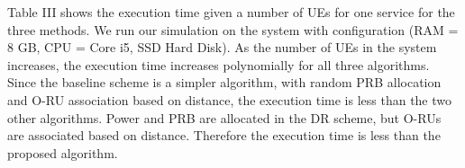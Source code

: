 \documentclass[lettersize,journal]{IEEEtran}
\begin{document}
Table III shows the execution time given a number of UEs for one service for the three methods. We run our simulation on the system with configuration (RAM = 8 GB, CPU = Core i5, SSD Hard Disk). 
 As the number of UEs in the system increases, the execution time increases polynomially for all three algorithms.
Since the baseline scheme is a simpler algorithm, with random PRB allocation and O-RU association based on distance, the execution time is less than the two other algorithms. Power and PRB are allocated in the DR scheme, but O-RUs are associated based on distance. Therefore the execution time is less than the proposed algorithm.
\begin{table}%
 \caption {Execution Time vs. Number of UEs} 
\begin{center}
\vspace*{-1.6em}
\end{center}
\end{table}
\end{document}
